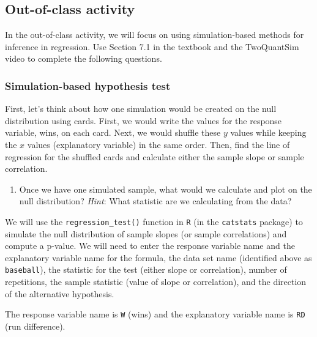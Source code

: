 \documentclass[
]{report}
\providecommand{\tightlist}{%
  \setlength{\itemsep}{0pt}\setlength{\parskip}{0pt}}
\begin{document}
\vspace{1in}

\hypertarget{out-of-class-activity-2}{%
\subsection{Out-of-class activity}\label{out-of-class-activity-2}}

In the out-of-class activity, we will focus on using simulation-based methods for inference in regression. Use Section 7.1 in the textbook and the TwoQuantSim video to complete the following questions.

\hypertarget{simulation-based-hypothesis-test-1}{%
\subsubsection*{Simulation-based hypothesis test}\label{simulation-based-hypothesis-test-1}}

First, let's think about how one simulation would be created on the null distribution using cards. First, we would write the values for the response variable, wins, on each card. Next, we would shuffle these \(y\) values while keeping the \(x\) values (explanatory variable) in the same order. Then, find the line of regression for the shuffled cards and calculate either the sample slope or sample correlation.

\begin{enumerate}
\def\labelenumi{\arabic{enumi}.}
\tightlist
\item
  Once we have one simulated sample, what would we calculate and plot on the null distribution? \emph{Hint}: What statistic are we calculating from the data?
\end{enumerate}

\vspace{1in}

We will use the \texttt{regression\_test()} function in \texttt{R} (in the \texttt{catstats} package) to simulate the null distribution of sample slopes (or sample correlations) and compute a p-value. We will need to enter the response variable name and the explanatory variable name for the formula, the data set name (identified above as \texttt{baseball}), the statistic for the test (either slope or correlation), number of repetitions, the sample statistic (value of slope or correlation), and the direction of the alternative hypothesis.

The response variable name is \texttt{W} (wins) and the explanatory variable name is \texttt{RD} (run difference).
\end{document}
